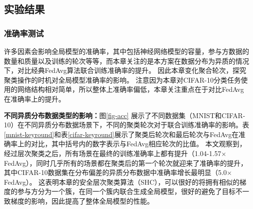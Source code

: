 \subsection{实验结果}

\subsubsection{准确率测试}

许多因素会影响全局模型的准确率，其中包括神经网络模型的容量，参与方数据的数量和质量以及训练的轮次等等，而本章关注的是本方案在数据分布为异质的情况下，对比经典FedAvg算法联合训练准确率的提升。
因此本章变化聚合轮次，探究聚类操作的时机对全局模型准确率的影响。
注意因为本章对CIFAR-10分类任务使用的网络结构相对简单，所以整体上准确率偏低，本章关注重点在于对比FedAvg在准确率上的提升。

\textbf{不同异质分布数据类型的影响：}图\ref{fig-acc} 展示了不同数据集（MNIST和CIFAR-10）在不同异质分布数据场景下，不同的聚类轮次对于联合训练准确率的影响。表\ref{mnist-keyround}和表\ref{cifar-keyround}展示了聚类后轮次和最后轮次与FedAvg在准确率上的对比，其中括号内的数字表示与FedAvg相应轮次的比值。
本文观察到，经过层次聚类之后，所有场景在最终的训练准确率上都有提升（1.04-1.57$\times$FedAvg），同时几乎所有的场景都在聚类后的第一个轮次就迎来了准确率的提升，
其中CIFAR-10数据集在分布偏差的异质分布数据中准确率增长最明显（5.0$\times$FedAvg）。
这表明本章的安全层次聚类算法（SHC），可以很好的将拥有相似的梯度的参与方分为一个簇，在同一个簇内联合生成全局模型，很好的避免了目标不一致梯度的影响，因此提高了整体全局模型的性能。

